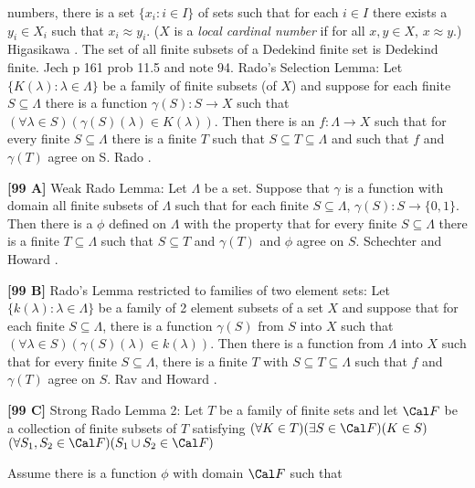 numbers, there is a set $\{x_i: i\in I\}$ of sets such that for each
$i\in I$ there exists a $y_i\in X_i$ such that $x_i\approx y_i$. ($X$ is a
{\it local cardinal number} if for all $x, y\in X$, $x\approx y$.)
\ac{Higasikawa} \cite{1995}.
\medskip
{} The set of all finite subsets of a Dedekind finite
set is Dedekind finite. \ac{Jech} \cite{1973b} p 161 prob 11.5 and note 94.
\medskip
{} Rado's Selection Lemma: Let $\{K(\lambda): \lambda
\in\Lambda\}$ be a family  of finite subsets (of $X$) and suppose for
each finite $S\subseteq\Lambda$ there is a function $\gamma(S): S
\rightarrow X$ such that $(\forall\lambda\in S)(\gamma(S)(\lambda)\in
K(\lambda))$.  Then there is an $f: \Lambda\rightarrow X$ such that
for every finite $S\subseteq\Lambda$ there is a finite $T$ such that
$S\subseteq T\subseteq\Lambda$ and such that $f$ and $\gamma (T)$
agree on S. \ac{Rado} \cite{1949}. 
\smallskip
\item{}{\bf [99 A]}  Weak Rado Lemma:  Let $\Lambda$ be a set. Suppose
that $\gamma$ is a function with domain all finite subsets of $\Lambda$
such that for each finite $S\subseteq\Lambda$, $\gamma(S): S \rightarrow
\{0,1\}$.  Then there is a $\phi$ defined on $\Lambda$ with the property
that for every finite $S\subseteq\Lambda$ there is a finite $T\subseteq
\Lambda$ such that $S\subseteq T$ and $\gamma(T)$ and $\phi$ agree on $S$.
\ac{Schechter} \cite{1996a} and \ac{Howard} \cite{1993}.
\smallskip
\item{}{\bf [99 B]}  Rado's Lemma restricted to families of two element
sets:  Let $\{k(\lambda): \lambda\in\Lambda\}$ be a family of 2
element  subsets of a set $X$ and suppose that for each finite $S
\subseteq\Lambda$, there is a function $\gamma(S)$ from $S$ into $X$
such that $(\forall\lambda\in  S)(\gamma(S)(\lambda) \in k(\lambda))$.
Then there is a function from $\Lambda$ into $X$ such that for every
finite $S\subseteq\Lambda$, there is a finite $T$ with $S\subseteq T
\subseteq\Lambda$ such that $f$ and $\gamma(T)$ agree on $S$.
\ac{Rav} \cite{1977} and \ac{Howard} \cite{1993}.
\smallskip
\item{}{\bf [99 C]}  Strong Rado Lemma 2:  Let $T$ be a family of finite
sets and let ${\Cal F}$ be a collection of finite subsets of $T$
satisfying
 $(\forall K\in T)(\exists S\in {\Cal F})(K\in S)$
 $(\forall S_{1}, S_{2}\in{\Cal F})(S_{1}\cup S_{2}\in
{\Cal F})$
\item{}Assume there is a function $\phi$ with domain ${\Cal F}$ such that
